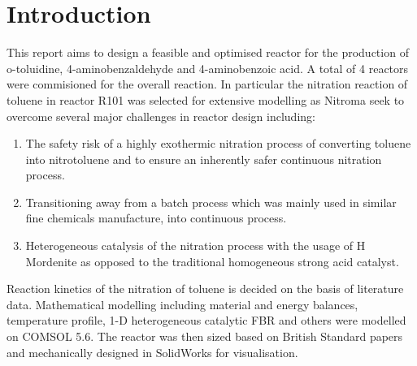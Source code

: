 \section{Introduction}
This report aims to design a feasible and optimised reactor for the production of o-toluidine, 4-aminobenzaldehyde and 4-aminobenzoic acid. A total of 4 reactors were commisioned for the overall reaction. 
In particular the nitration reaction of toluene in reactor R101 was selected for extensive modelling as Nitroma seek to overcome several major challenges in reactor design including:

\begin{enumerate}
    \item The safety risk of a highly exothermic nitration process of converting toluene into nitrotoluene and to ensure an inherently safer continuous nitration process. 
    \item Transitioning away from a batch process which was mainly used in similar fine chemicals manufacture, into continuous process. 
    \item Heterogeneous catalysis of the nitration process with the usage of H Mordenite as opposed to the traditional homogeneous strong acid catalyst. 
\end{enumerate}

Reaction kinetics of the nitration of toluene is decided on the basis of literature data. Mathematical modelling including material and energy balances, temperature profile, 1-D heterogeneous catalytic FBR and others were modelled on COMSOL 5.6. The reactor was then sized based on British Standard papers and mechanically designed in SolidWorks for visualisation. 



